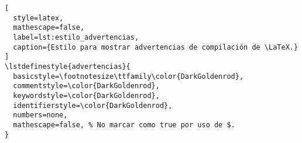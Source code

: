 \begin{lstlisting}[
  style=latex,
  mathescape=false,
  label=lst:estilo_advertencias,
  caption={Estilo para mostrar advertencias de compilación de \LaTeX.}
]
\lstdefinestyle{advertencias}{
  basicstyle=\footnotesize\ttfamily\color{DarkGoldenrod},
  commentstyle=\color{DarkGoldenrod},
  keywordstyle=\color{DarkGoldenrod},
  identifierstyle=\color{DarkGoldenrod},
  numbers=none,
  mathescape=false, % No marcar como true por uso de $.
}
\end{lstlisting}